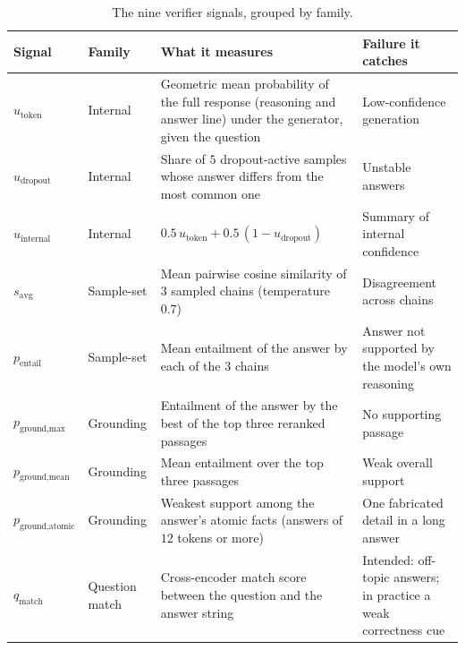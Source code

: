 \begin{table}[!htbp]
\centering
\footnotesize
\begin{tabular}{@{}>{\raggedright\arraybackslash}p{2.0cm}>{\raggedright\arraybackslash}p{2.2cm}>{\raggedright\arraybackslash}p{5.2cm}>{\raggedright\arraybackslash}p{4.0cm}@{}}
\toprule
\textbf{Signal} & \textbf{Family} & \textbf{What it measures} & \textbf{Failure it catches} \\
\midrule
$u_{\text{token}}$ & Internal & Geometric mean probability of the full response (reasoning and answer line) under the generator, given the question & Low-confidence generation \\
$u_{\text{dropout}}$ & Internal & Share of $5$ dropout-active samples whose answer differs from the most common one & Unstable answers \\
$u_{\text{internal}}$ & Internal & $0.5\,u_{\text{token}} + 0.5\,(1-u_{\text{dropout}})$ & Summary of internal confidence \\
$s_{\text{avg}}$ & Sample-set & Mean pairwise cosine similarity of $3$ sampled chains (temperature $0.7$) & Disagreement across chains \\
$p_{\text{entail}}$ & Sample-set & Mean entailment of the answer by each of the $3$ chains & Answer not supported by the model's own reasoning \\
$p_{\text{ground,max}}$ & Grounding & Entailment of the answer by the best of the top three reranked passages & No supporting passage \\
$p_{\text{ground,mean}}$ & Grounding & Mean entailment over the top three passages & Weak overall support \\
$p_{\text{ground,atomic}}$ & Grounding & Weakest support among the answer's atomic facts (answers of $12$ tokens or more) & One fabricated detail in a long answer \\
$q_{\text{match}}$ & Question match & Cross-encoder match score between the question and the answer string & Intended: off-topic answers; in practice a weak correctness cue \\
\bottomrule
\end{tabular}
\caption[The nine verifier signals.]{The nine verifier signals, grouped by family.}
\label{tab:verifier-signals}
\end{table}

